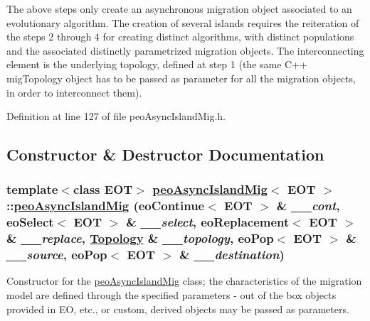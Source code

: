 The above steps only create an asynchronous migration object associated to an evolutionary algorithm. The creation of several islands requires the reiteration of the steps 2 through 4 for creating distinct algorithms, with distinct populations and the associated distinctly parametrized migration objects. The interconnecting element is the underlying topology, defined at step 1 (the same C++ mig\-Topology object has to be passed as parameter for all the migration objects, in order to interconnect them). 



Definition at line 127 of file peo\-Async\-Island\-Mig.h.

\subsection{Constructor \& Destructor Documentation}
\hypertarget{classpeoAsyncIslandMig_e0f706cbf4148d3ca327227a5c7a9fdf}{
\subsubsection[peoAsyncIslandMig]{\setlength{\rightskip}{0pt plus 5cm}template$<$class EOT$>$ \hyperlink{classpeoAsyncIslandMig}{peo\-Async\-Island\-Mig}$<$ EOT $>$::\hyperlink{classpeoAsyncIslandMig}{peo\-Async\-Island\-Mig} (eo\-Continue$<$ EOT $>$ \& {\em \_\-\_\-cont}, eo\-Select$<$ EOT $>$ \& {\em \_\-\_\-select}, eo\-Replacement$<$ EOT $>$ \& {\em \_\-\_\-replace}, \hyperlink{classTopology}{Topology} \& {\em \_\-\_\-topology}, eo\-Pop$<$ EOT $>$ \& {\em \_\-\_\-source}, eo\-Pop$<$ EOT $>$ \& {\em \_\-\_\-destination})}}
\label{classpeoAsyncIslandMig_e0f706cbf4148d3ca327227a5c7a9fdf}


Constructor for the \hyperlink{classpeoAsyncIslandMig}{peo\-Async\-Island\-Mig} class; the characteristics of the migration model are defined through the specified parameters - out of the box objects provided in EO, etc., or custom, derived objects may be passed as parameters. 

